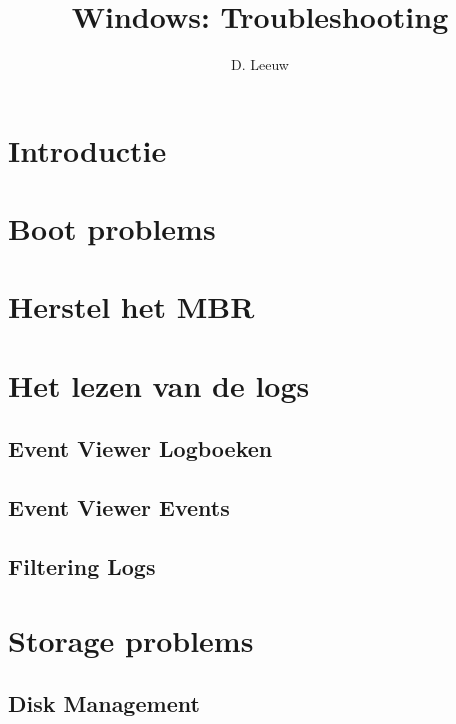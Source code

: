 \documentclass[a4paper,12pt,twoside,titlepage]{article}
\author{D. Leeuw}
\title{Windows: Troubleshooting}
\date{\today\\
0.0.0
\vfill
\raggedright
\copyright\ 2025 Dennis Leeuw\\
}
\begin{document}

\maketitle




\section{Introductie}


\section{Boot problems}

\section{Herstel het MBR}


\section{Het lezen van de logs}

\subsection{Event Viewer Logboeken}


\subsection{Event Viewer Events}

\subsection{Filtering Logs}


\section{Storage problems}
\subsection{Disk Management}

\end{document}
